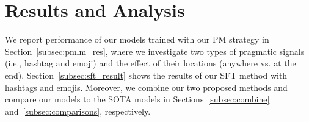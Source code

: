 \vspace{-5pt}
\section{Results and Analysis}
\vspace{-5pt}
 We report performance of our models trained with our PM strategy in Section~\ref{subsec:pmlm_res}, where we investigate two types of pragmatic signals (i.e., hashtag and emoji) and the effect of their locations (anywhere vs. at the end). Section~\ref{subsec:sft_result} shows the results of our SFT method with hashtags and emojis. Moreover, we combine our two proposed methods and compare our models to the SOTA models in Sections~\ref{subsec:combine} and~\ref{subsec:comparisons}, respectively. 





 
 



